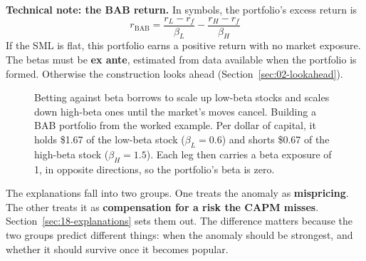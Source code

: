 \begin{technote}
\textbf{Technical note: the BAB return.} In symbols, the portfolio's excess return is
\begin{equation}
  r_{\mathrm{BAB}} = \frac{r_L - r_f}{\beta_L} - \frac{r_H - r_f}{\beta_H}
  \label{eq:18-bab}
\end{equation}
If the SML is flat, this portfolio earns a positive return with no market exposure. The betas must be \textbf{ex ante}, estimated from data available when the portfolio is formed. Otherwise the construction looks ahead (Section~\ref{sec:02-lookahead}).
\end{technote}

\begin{figure}[htbp]
\centering
{}
\caption{Betting against beta borrows to scale up low-beta stocks and scales down high-beta ones until the market's moves cancel. Building a BAB portfolio from the worked example. Per dollar of capital, it holds \$1.67 of the low-beta stock ($\beta_L = 0.6$) and shorts \$0.67 of the high-beta stock ($\beta_H = 1.5$). Each leg then carries a beta exposure of 1, in opposite directions, so the portfolio's beta is zero.}
\label{fig:18-bab}
\end{figure}

The explanations fall into two groups. One treats the anomaly as \textbf{mispricing}. The other treats it as \textbf{compensation for a risk the CAPM misses}. Section~\ref{sec:18-explanations} sets them out. The difference matters because the two groups predict different things: when the anomaly should be strongest, and whether it should survive once it becomes popular.

